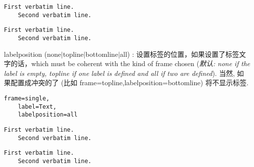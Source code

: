 \documentclass[twoside]{article}
\providecommand\optname[1]{\textsf{#1}}
\newenvironment{optlist}{\begin{description}%
  \renewcommand\makelabel[1]{%
    \descriptionlabel{\mdseries\optname{##1}}}%
  \itemsep0.25\itemsep}%
 {\end{description}}
\begin{document}

\begin{SideBySideExample}
  \begin{Verbatim}[frame=single,
                   label=My text]
    First verbatim line.
    Second verbatim line.
  \end{Verbatim}

  \begin{Verbatim}[frame=topline,
      framesep=4mm,
      label=\fbox{\Large\emph{The code}}]
    First verbatim line.
    Second verbatim line.
  \end{Verbatim}
\end{SideBySideExample}

\begin{optlist}
  \item[labelposition (none$\mid$topline$\mid$bottomline$\mid$all)]:
  设置标签的位置，如果设置了标签文字的话，which must be
  coherent with the kind of frame chosen
  (\emph{默认: none if the label is empty, topline if one label is
  defined and all if two are defined}).
  当然, 如果配置成冲突的了 (比如
  \textsf{frame=topline,labelposition=bottomline}) 将不显示标签.
\end{optlist}


\begin{SideBySideExample}
  \begin{Verbatim}[frame=single,
         framesep=2mm,
         label=Text,labelposition=all]
    frame=single,
    label=Text,
    labelposition=all
  \end{Verbatim}
\end{SideBySideExample}

\begin{SideBySideExample}
  \begin{Verbatim}[frame=lines,
         label=Text,labelposition=topline]
    First verbatim line.
    Second verbatim line.
  \end{Verbatim}
\end{SideBySideExample}

\begin{SideBySideExample}
  \begin{Verbatim}[frame=bottomline,
         framesep=3mm,
         label=\textit{Code included},
         labelposition=bottomline]
    First verbatim line.
    Second verbatim line.
  \end{Verbatim}
\end{SideBySideExample}
\end{document}
